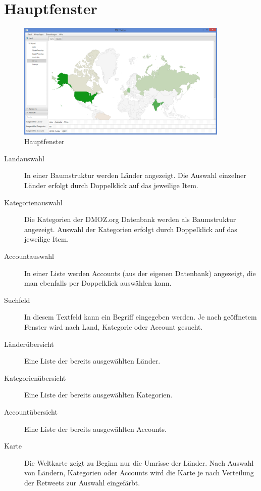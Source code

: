 
\section{Hauptfenster}

\begin{figure}[h]
	\centering
	\includegraphics[width=0.9\textwidth]{img/DemoGUIMain.png}
	\caption{Hauptfenster}
	\label{c:Hauptfenster}
\end{figure}

\begin{description}
	\item[Landauswahl] In einer Baumstruktur werden Länder angezeigt. Die Auswahl einzelner Länder erfolgt durch Doppelklick auf das jeweilige Item.
	\item[Kategorienauswahl] Die Kategorien der DMOZ.org Datenbank werden als Baumstruktur angezeigt. Auswahl der Kategorien erfolgt durch Doppelklick auf das jeweilige Item.
	\item[Accountauswahl] In einer Liste werden Accounts (aus der eigenen Datenbank) angezeigt, die man ebenfalls per Doppelklick auswählen kann.
	\item[Suchfeld] In diesem Textfeld kann ein Begriff eingegeben werden. Je nach geöffnetem Fenster wird nach Land, Kategorie oder Account gesucht.
	\item[Länderübersicht] Eine Liste der bereits ausgewählten Länder.
	\item[Kategorienübersicht] Eine Liste der bereits ausgewählten Kategorien.
	\item[Accountübersicht] Eine Liste der bereits ausgewählten Accounts.
	\item[Karte] Die Weltkarte zeigt zu Beginn nur die Umrisse der Länder. Nach Auswahl von Ländern, Kategorien oder Accounts wird die Karte je nach Verteilung der Retweets zur Auswahl eingefärbt.	
\end{description}

